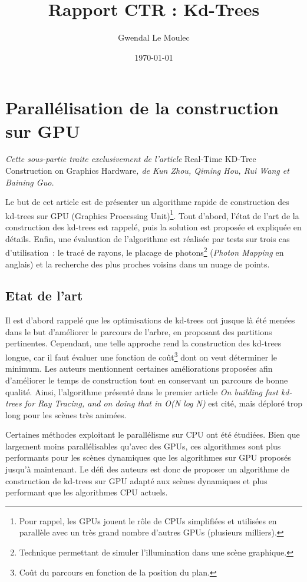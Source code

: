 \documentclass[a4paper]{article}
\title{Rapport CTR : Kd-Trees}
\author{Gwendal Le Moulec}
\date{\today}
\begin{document}
\section{Parallélisation de la construction sur GPU}

\textit{Cette sous-partie traite exclusivement de l'article} Real-Time KD-Tree Construction on Graphics Hardware\textit{, de Kun Zhou, Qiming Hou, Rui Wang et Baining Guo.}

Le but de cet article est de présenter un algorithme rapide de construction des kd-trees sur GPU (Graphics Processing Unit)\footnote{Pour rappel, les GPUs jouent le rôle de CPUs simplifiées et utilisées en parallèle avec un très grand nombre d'autres GPUs (plusieurs milliers).}. Tout d'abord, l'état de l'art de la construction des kd-trees est rappelé, puis la solution est proposée et expliquée en détails. Enfin, une évaluation de l'algorithme est réalisée par tests sur trois cas d'utilisation~: le tracé de rayons, le placage de photons\footnote{Technique permettant de simuler l'illumination dans une scène graphique.} (\textit{Photon Mapping} en anglais) et la recherche des plus proches voisins dans un nuage de points.

\subsection{Etat de l'art}
Il est d'abord rappelé que les optimisations de kd-trees ont jusque là été menées dans le but d'améliorer le parcours de l'arbre, en proposant des partitions pertinentes. Cependant, une telle approche rend la construction des kd-trees longue, car il faut évaluer une fonction de coût\footnote{Coût du parcours en fonction de la position du plan.} dont on veut déterminer le minimum. Les auteurs mentionnent certaines améliorations proposées afin d'améliorer le temps de construction tout en conservant un parcours de bonne qualité. Ainsi, l'algorithme présenté dans le premier article \textit{On building fast kd-trees for Ray Tracing, and on doing that in O(N log N)} est cité, mais déploré trop long pour les scènes très animées.

Certaines méthodes exploitant le parallélisme sur CPU ont été étudiées. Bien que largement moins parallélisables qu'avec des GPUs, ces algorithmes sont plus performants pour les scènes dynamiques que les algorithmes sur GPU proposés jusqu'à maintenant. Le défi des auteurs est donc de proposer un algorithme de construction de kd-trees sur GPU adapté aux scènes dynamiques et plus performant que les algorithmes CPU actuels.
\end{document}
